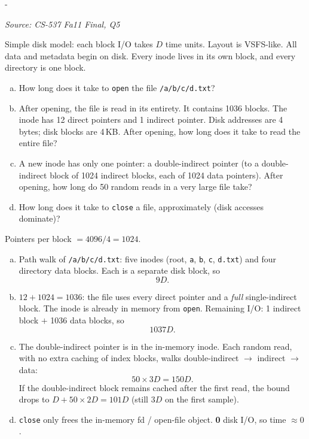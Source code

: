 \documentclass[11pt,a4paper]{article}
\makeatletter
\newcommand{\keepspace}[1]{\par\penalty-100\begingroup
  \setlength{\dimen@}{#1}\dimen@ii\pagegoal\advance\dimen@ii-\pagetotal
  \ifdim\dimen@>\dimen@ii\ifdim\dimen@ii>\z@\vfil\fi\break\fi\endgroup}
\newcounter{qn}[section]
\newenvironment{Qn}[4]{%
  \refstepcounter{qn}\keepspace{7\baselineskip}%
  \begin{tcolorbox}[qboxstyle, title={Q\thesection.\theqn\ \ [#1 \textbar\ #2]\ \ #4}]%
  {\footnotesize\color{g3}\textit{Source: #3}}\par\smallskip%
}{%
  \end{tcolorbox}%
}
\newenvironment{Sol}{%
  \begin{tcolorbox}[sboxstyle, title={Solution}]%
}{%
  \end{tcolorbox}\vspace{0.35em}%
}
\makeatother
\begin{document}
\begin{Qn}{Hard}{Lect 23--24}{CS-537 Fa11 Final, Q5}{Open/read/close times under a 12$+$1 inode}
Simple disk model: each block I/O takes $D$ time units. Layout is VSFS-like.
All data and metadata begin on disk. Every inode lives in its own block, and
every directory is one block.
\begin{enumerate}[(a)]
\item How long does it take to \texttt{open} the file \texttt{/a/b/c/d.txt}?
\item After opening, the file is read in its entirety. It contains 1036
      blocks. The inode has 12 direct pointers and 1 indirect pointer.
      Disk addresses are 4 bytes; disk blocks are 4\,KB. After opening,
      how long does it take to read the entire file?
\item A new inode has only one pointer: a double-indirect pointer (to a
      double-indirect block of 1024 indirect blocks, each of 1024 data
      pointers). After opening, how long do 50 random reads in a very
      large file take?
\item How long does it take to \texttt{close} a file, approximately
      (disk accesses dominate)?
\end{enumerate}
\end{Qn}
\begin{Sol}
Pointers per block $= 4096/4 = 1024$.
\begin{enumerate}[(a)]
\item Path walk of \texttt{/a/b/c/d.txt}: five inodes (root, \texttt{a},
      \texttt{b}, \texttt{c}, \texttt{d.txt}) and four directory data
      blocks. Each is a separate disk block, so
      \[
        9D.
      \]
\item $12 + 1024 = 1036$: the file uses every direct pointer and a
      \emph{full} single-indirect block. The inode is already in memory
      from \texttt{open}. Remaining I/O: 1 indirect block $+$ 1036 data
      blocks, so
      \[
        1037D.
      \]
\item The double-indirect pointer is in the in-memory inode. Each random
      read, with no extra caching of index blocks, walks
      double-indirect $\to$ indirect $\to$ data:
      \[
        50 \times 3D = 150D.
      \]
      If the double-indirect block remains cached after the first read,
      the bound drops to $D + 50\times 2D = 101D$ (still $3D$ on the
      first sample).
\item \texttt{close} only frees the in-memory fd / open-file object.
      \textbf{0} disk I/O, so time $\approx 0$.
\end{enumerate}
\end{Sol}
\end{document}
